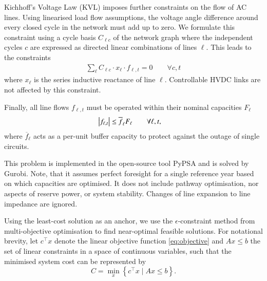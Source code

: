Kichhoff's Voltage Law (KVL) imposes further constraints on the flow of AC
lines. Using linearised load flow assumptions, the voltage angle difference
around every closed cycle in the network must add up to zero. We formulate this
constraint using a cycle basis $C_{\ell c}$ of the network graph where the
independent cycles $c$ are expressed as directed linear combinations of lines
$\ell$.\cite{cycleflows} This leads to the constraints
\begin{align}
    \sum_\ell C_{\ell c} \cdot x_\ell \cdot f_{\ell,t} = 0 \qquad\forall c,t
    \label{eq:kvl}
\end{align}
where $x_\ell$ is the series inductive reactance of line $\ell$. Controllable
HVDC links are not affected by this constraint.

Finally, all line flows $f_{\ell,t}$ must be operated within their nominal
capacities $F_\ell$
\begin{align}
    \left|f_{\ell,t}\right| \leq \overline{f}_{\ell} F_{\ell} & \qquad\forall \ell, t,
    \label{eq:lastA}
\end{align}
where $\overline{f}_\ell$ acts as a per-unit buffer capacity to protect against
the outage of single circuits.

This problem is implemented in the open-source tool PyPSA\cite{pypsa} and is
solved by Gurobi. Note, that it assumes perfect foresight for a single reference
year based on which capacities are optimised. It does not include pathway
optimisation, nor aspects of reserve power, or system stability. Changes of line
expansion to line impedance are ignored.


Using the least-cost solution as an anchor, we use the $\epsilon$-constraint
method from multi-objective optimisation to find near-optimal feasible
solutions.\cite{nearoptimal,mavrotas_effective_2009} For notational brevity, let
$c^\top x$ denote the linear objective function \cref{eq:objective} and $Ax\leq
b$ the set of linear constraints  in a space of
continuous variables, such that the minimised system cost can be represented by
\begin{equation}
    C = \min_x\left\{c^\top x \mid Ax\leq b\right\}.
\end{equation}


